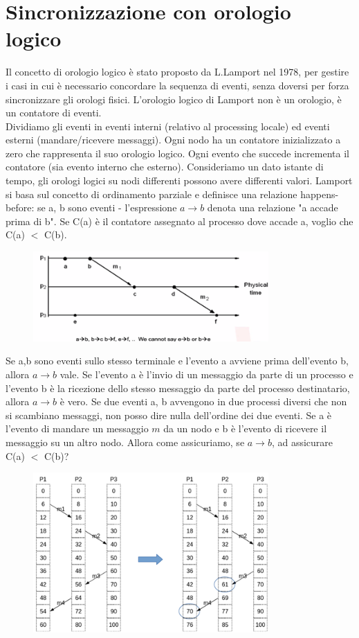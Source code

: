 \documentclass[12pt,italian]{report}
\begin{document}
\section{Sincronizzazione con orologio logico}
Il concetto di orologio logico è stato proposto da L.Lamport nel 1978, per gestire i casi in cui è necessario concordare la sequenza di eventi, senza doversi per forza sincronizzare gli orologi fisici. L'orologio logico di Lamport non è un orologio, è un contatore di eventi. \\ Dividiamo gli eventi in eventi interni (relativo al processing locale) ed eventi esterni (mandare/ricevere messaggi). 
\bigbreak
Ogni nodo ha un contatore inizializzato a zero che rappresenta il suo orologio logico. Ogni evento che succede incrementa il contatore (sia evento interno che esterno). Consideriamo un dato istante di tempo, gli orologi logici su nodi differenti possono avere differenti valori. 
\bigbreak
Lamport si basa sul concetto di ordinamento parziale e definisce una relazione happens-before: se a, b sono eventi - l'espressione $a \longrightarrow b$ denota una relazione "a accade prima di b". Se C(a) è il contatore assegnato al processo dove accade a, voglio che C(a) $<$ C(b).
\begin{figure}[h]
\centering
\includegraphics[width=90mm]{img/lamport.png}
\end{figure}
\bigbreak
Se a,b sono eventi sullo stesso terminale e l'evento a avviene prima dell'evento b, allora  $a \longrightarrow b$ vale. Se l'evento a è l'invio di un messaggio da parte di un processo e l'evento b è la ricezione dello stesso messaggio da parte del processo destinatario, allora  $a \longrightarrow b$ è vero. Se due eventi a, b avvengono in due processi diversi che non si scambiano messaggi, non posso dire nulla dell'ordine dei due eventi. 
\bigbreak
Se a è l'evento di mandare un messaggio $m$ da un nodo e b è l'evento di ricevere il messaggio su un altro nodo. Allora come assicuriamo, se  $a \longrightarrow b$, ad assicurare C(a) $<$ C(b)?
\begin{figure}[h]
\centering
\includegraphics[width=90mm]{img/exla.png}
\end{figure}
\end{document}
